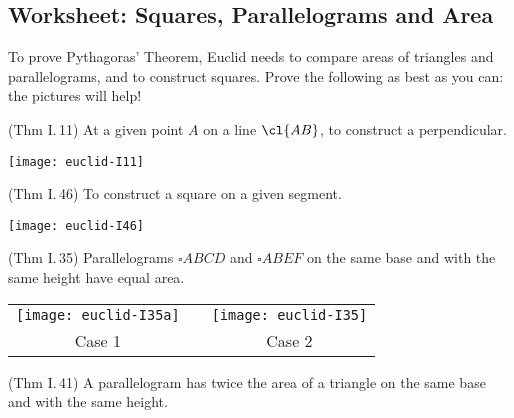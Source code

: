 \graphicspath{{lectures/1axioms/asy/}}

\pagestyle{empty}

\subsection*{Worksheet: Squares, Parallelograms and Area}

To prove Pythagoras' Theorem, Euclid needs to compare areas of triangles and parallelograms, and to construct squares. Prove the following as best as you can: the pictures will help!
\begin{enumerate}
\begin{minipage}[t]{0.6\linewidth}\vspace{0pt}
	\item (Thm I.\,11) At a given point $A$ on a line $\cl{AB}$, to construct a perpendicular.
\end{minipage}\begin{minipage}[t]{0.4\linewidth}\vspace{0pt}
	\flushright\texttt{[image: euclid-I11]}
\end{minipage}
	
	\vfill
	
	\begin{minipage}[t]{0.6\linewidth}\vspace{0pt}
	\item (Thm I.\,46) To construct a square on a given segment.
\end{minipage}\begin{minipage}[t]{0.4\linewidth}\vspace{0pt}
	\flushright\texttt{[image: euclid-I46]}
\end{minipage}

\vfill\newpage

	\item (Thm I.\,35) Parallelograms $\square ABCD$ and $\square ABEF$ on the same base and with the same height have equal area.
	\begin{center}
	\begin{tabular}{ccc}
	\texttt{[image: euclid-I35a]}&\qquad\qquad\qquad&\texttt{[image: euclid-I35]}\\
	Case 1&&Case 2
	\end{tabular}
	\end{center}
	
	\vfill\vfill
	
	\item (Thm I.\,41) A parallelogram has twice the area of a triangle on the same base and with the same height.
\end{enumerate}

\vfill
	
